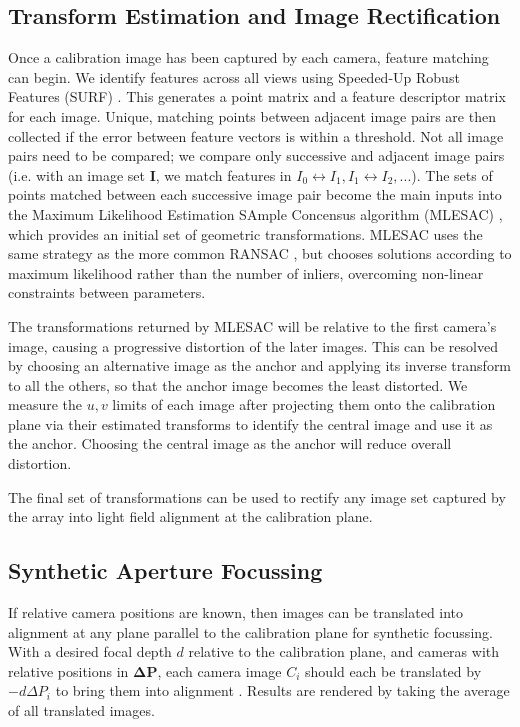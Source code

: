\documentclass{article} \usepackage{acra}
\begin{document}
\subsection{Transform Estimation and Image Rectification}

Once a calibration image has been captured by each camera, feature matching can
begin. We identify features across all views using Speeded-Up Robust Features
(SURF) \cite{bay2008speeded}. This generates a point matrix and a feature
descriptor matrix for each image. Unique, matching points between adjacent image
pairs are then collected if the error between feature vectors is within a
threshold. Not all image pairs need to be compared; we compare only successive
and adjacent image pairs (i.e. with an image set $\bm{I}$, we match features in
$I_0\leftrightarrow{}I_1,I_1\leftrightarrow{}I_2,...$). The sets of points
matched between each successive image pair become the main inputs into the
Maximum Likelihood Estimation SAmple Concensus algorithm (MLESAC)
\cite{torr2000mlesac}, which provides an initial set of geometric
transformations. MLESAC uses the same strategy as the more common RANSAC
\cite{fischler1981random}, but chooses solutions according to maximum likelihood
rather than the number of inliers, overcoming non-linear constraints between
parameters.


The transformations returned by MLESAC will be relative to the first camera's
image, causing a progressive distortion of the later images. This can be
resolved by choosing an alternative image as the anchor and applying its inverse
transform to all the others, so that the anchor image becomes the least
distorted. We measure the $u,v$ limits of each image after projecting them onto
the calibration plane via their estimated transforms to identify the central
image and use it as the anchor. Choosing the central image as the anchor will
reduce overall distortion.

The final set of transformations can be used to rectify any image set captured
by the array into light field alignment at the calibration plane.

\subsection{Synthetic Aperture Focussing}

If relative camera positions are known, then images can be translated into
alignment at any plane parallel to the calibration plane for synthetic
focussing. With a desired focal depth $d$ relative to the calibration plane, and
cameras with relative positions in $\bm{\Delta P}$, each camera image $C_i$
should each be translated by $-d\Delta P_i$ to bring them into alignment
\cite{vaish_using_2004}. Results are rendered by taking the average of all
translated images.
\end{document}
